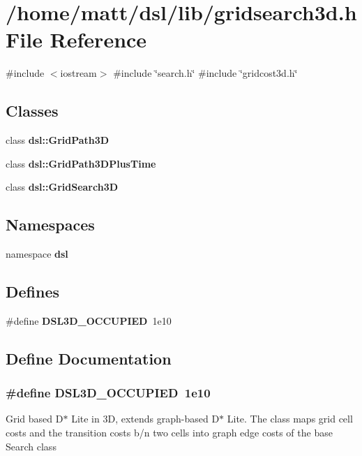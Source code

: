 \section{/home/matt/dsl/lib/gridsearch3d.h \-File \-Reference}
\label{gridsearch3d_8h}
{\ttfamily \#include $<$iostream$>$}\*
{\ttfamily \#include \char`\"{}search.\-h\char`\"{}}\*
{\ttfamily \#include \char`\"{}gridcost3d.\-h\char`\"{}}\*
\subsection*{\-Classes}
\begin{DoxyCompactItemize}
\item 
class {\bf dsl\-::\-Grid\-Path3\-D}
\item 
class {\bf dsl\-::\-Grid\-Path3\-D\-Plus\-Time}
\item 
class {\bf dsl\-::\-Grid\-Search3\-D}
\end{DoxyCompactItemize}
\subsection*{\-Namespaces}
\begin{DoxyCompactItemize}
\item 
namespace {\bf dsl}
\end{DoxyCompactItemize}
\subsection*{\-Defines}
\begin{DoxyCompactItemize}
\item 
\#define {\bf \-D\-S\-L3\-D\-\_\-\-O\-C\-C\-U\-P\-I\-E\-D}~1e10
\end{DoxyCompactItemize}


\subsection{\-Define \-Documentation}
\subsubsection[{\-D\-S\-L3\-D\-\_\-\-O\-C\-C\-U\-P\-I\-E\-D}]{\setlength{\rightskip}{0pt plus 5cm}\#define {\bf \-D\-S\-L3\-D\-\_\-\-O\-C\-C\-U\-P\-I\-E\-D}~1e10}\label{gridsearch3d_8h_a82dc4d23dd619ee2c37f8bf2e15a34a3}
\-Grid based \-D$\ast$ \-Lite in 3\-D, extends graph-\/based \-D$\ast$ \-Lite. \-The class maps grid cell costs and the transition costs b/n two cells into graph edge costs of the base \-Search class

